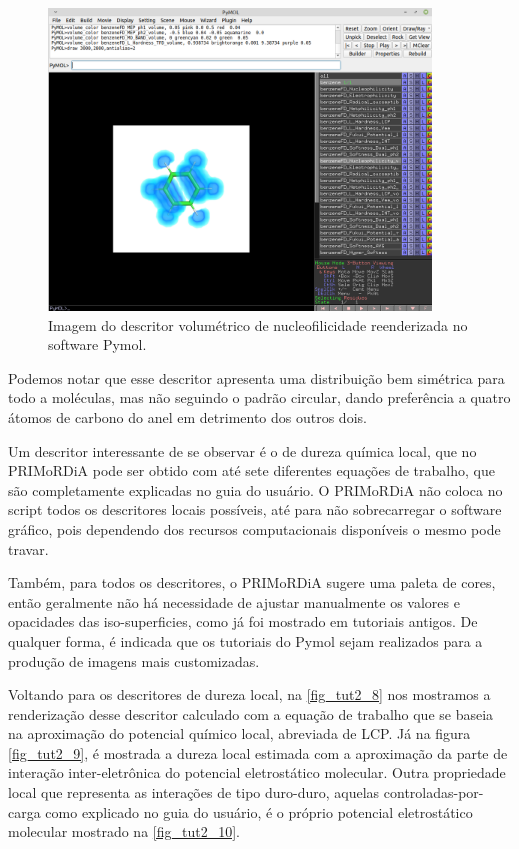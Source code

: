 \documentclass[a4paper,11pt]{refart}
\begin{document}
\hspace*{-\leftmarginwidth}
\begin{minipage}{\fullwidth}
	\begin{figure}[H]
		\begin{center}
			\includegraphics[width=4in]{images/tut2_img8}
			\caption{Imagem do descritor volumétrico de nucleofilicidade reenderizada no software Pymol.}
			\label{fig_tut2_7}
		\end{center}
	\end{figure}
\end{minipage}

Podemos notar que esse descritor apresenta uma distribuição bem simétrica para todo a moléculas, mas não seguindo o padrão circular, dando preferência a quatro átomos de carbono  do anel em detrimento dos outros dois. 

Um descritor interessante de se observar é o de dureza química local, que no PRIMoRDiA pode ser obtido com até sete diferentes equações de trabalho, que são completamente explicadas no guia do usuário. O PRIMoRDiA não coloca no script todos os descritores locais possíveis, até para não sobrecarregar o software gráfico, pois dependendo dos recursos computacionais disponíveis o mesmo pode travar. 

Também, para todos os descritores, o PRIMoRDiA sugere uma paleta de cores, então geralmente não há necessidade de ajustar manualmente os valores e opacidades das iso-superficies, como já foi mostrado em tutoriais antigos. De qualquer forma, é indicada que os tutoriais do Pymol sejam realizados para a produção de imagens mais customizadas. 

Voltando para os descritores de dureza local, na \autoref{fig_tut2_8} nos mostramos a renderização desse descritor calculado com a equação de trabalho que se baseia na aproximação do potencial químico local, abreviada de LCP. Já na figura \autoref{fig_tut2_9}, é mostrada a dureza local estimada com a aproximação da parte de interação inter-eletrônica do potencial eletrostático molecular. Outra propriedade local que representa as interações de tipo duro-duro, aquelas controladas-por-carga como explicado no guia do usuário, é o próprio potencial eletrostático molecular mostrado na \autoref{fig_tut2_10}. 
\end{document}

